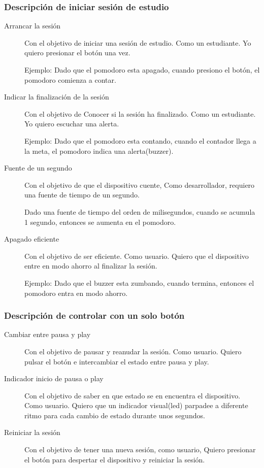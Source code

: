 \documentclass{article}
\begin{document}
\subsubsection{Descripción de iniciar sesión de estudio}
\begin{description}
	\item [Arrancar la sesión] Con el objetivo de iniciar una sesión de 
		estudio. Como un estudiante. Yo quiero presionar el botón una
		vez.

		\CheckedBox Ejemplo: Dado que el pomodoro esta apagado, cuando 
		presiono el
		botón, el pomodoro comienza a contar.
	
	\item [Indicar la finalización de la sesión] Con el objetivo de Conocer
		si la sesión ha finalizado. Como un estudiante. Yo quiero 
		escuchar una alerta.

		\CheckedBox Ejemplo: Dado que el pomodoro esta contando, cuando 
		el contador
		llega a la meta, el pomodoro indica una alerta(buzzer).
	\item [Fuente de un segundo] Con el objetivo de que el dispositivo 
		cuente, Como desarrollador, requiero una fuente de tiempo de
		un segundo.
		
		\CheckedBox Dado una fuente de tiempo del orden de milisegundos,
		cuando se acumula 1 segundo, entonces se aumenta en el pomodoro.

	\item [Apagado eficiente] Con el objetivo de ser eficiente. 
		Como usuario. Quiero que el dispositivo entre en modo ahorro
		al finalizar la sesión.

		\CheckedBox Ejemplo: Dado que el buzzer esta zumbando, cuando 
		termina, entonces el pomodoro entra en modo ahorro.
\end{description}
\subsubsection{Descripción de controlar con un solo botón}
\begin{description}
	\item[Cambiar entre pausa y play] Con el objetivo de pausar y reanudar
		la sesión. Como usuario. Quiero pulsar el botón e intercambiar
		el estado entre pausa y play.

	\item[Indicador inicio de pausa o play] Con el objetivo de saber en que
		estado se en encuentra el dispositivo. Como usuario. Quiero que
		un indicador visual(led) parpadee a diferente ritmo para cada 
		cambio de estado durante unos segundos.
	\item[Reiniciar la sesión] Con el objetivo de tener una nueva sesión, 
		como usuario, Quiero presionar el botón para despertar el 
		dispositivo y reiniciar la sesión.
\end{description}
\end{document}
